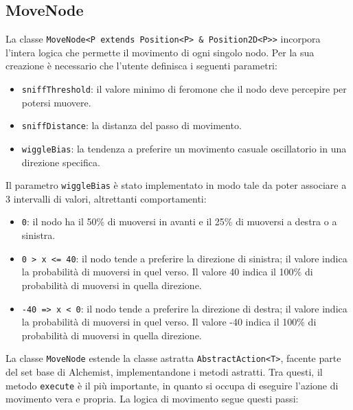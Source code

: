 \subsection{MoveNode}\label{moveNode}
La classe \texttt{MoveNode<P extends Position<P> \& Position2D<P>>} incorpora l'intera logica che permette il movimento di ogni singolo nodo. 
Per la sua creazione è necessario che l'utente definisca i seguenti parametri:
\begin{itemize}
    \item \texttt{sniffThreshold}: il valore minimo di feromone che il nodo deve percepire per potersi muovere.
    \item \texttt{sniffDistance}: la distanza del passo di movimento.
    \item \texttt{wiggleBias}: la tendenza a preferire un movimento casuale oscillatorio in una direzione specifica.
\end{itemize}
Il parametro \texttt{wiggleBias} è stato implementato in modo tale da poter associare a 3 intervalli di valori, altrettanti comportamenti:
\begin{itemize}
    \item \texttt{0}: il nodo ha il 50\% di muoversi in avanti e il 25\% di muoversi a destra o a sinistra.
    \item \texttt{0 > x <= 40}: il nodo tende a preferire la direzione di sinistra; il valore indica la probabilità di muoversi in quel verso.
    Il valore 40 indica il 100\% di probabilità di muoversi in quella direzione.
    \item \texttt{-40 => x < 0}: il nodo tende a preferire la direzione di destra; il valore indica la probabilità di muoversi in quel verso.
    Il valore -40 indica il 100\% di probabilità di muoversi in quella direzione.
\end{itemize}
La classe \texttt{MoveNode} estende la classe astratta \texttt{AbstractAction<T>}, facente parte del set base di Alchemist, implementandone i metodi astratti.
Tra questi, il metodo \texttt{execute} è il più importante, in quanto si occupa di eseguire l'azione di movimento vera e propria.
La logica di movimento segue questi passi:
